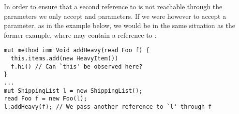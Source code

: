 In order to ensure that a second reference to \Q@this@ is not reachable through the parameters we only accept \Q@imm@ and \Q@capsule@ parameters.
If we were however to accept a \Q@read@ parameter, as in the example below,
we would be in the same situation as the former example, where \Q@f@ may contain
a reference to \Q@this@:
\saveSpace
\begin{lstlisting}
mut method imm Void addHeavy(read Foo f) {
  this.items.add(new HeavyItem())
  f.hi() // Can `this' be observed here?
}
...
mut ShippingList l = new ShippingList();
read Foo f = new Foo(l);
l.addHeavy(f); // We pass another reference to `l' through f
\end{lstlisting}
\saveSpace



